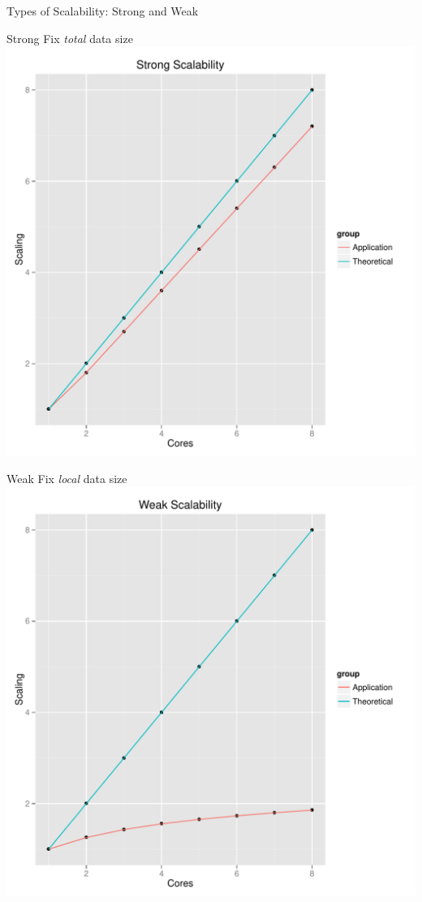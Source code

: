 \begin{frame}
  \begin{block}{Types of Scalability:  Strong and Weak}
   \begin{center}
    \begin{minipage}{.475\textwidth}
    \begin{block}{Strong}
      Fix \emph{total} data size
      \centering
      \includegraphics[width=.95\textwidth]{pics/scale_strong}
    \end{block}
    \end{minipage}
    \hspace{.1cm}
    \begin{minipage}{.475\textwidth}
    \begin{block}{Weak}
      Fix \emph{local} data size
      \centering
      \includegraphics[width=.95\textwidth]{pics/scale_weak}

\end{block}
\end{minipage}
\end{center}
\end{block}
\end{frame}
